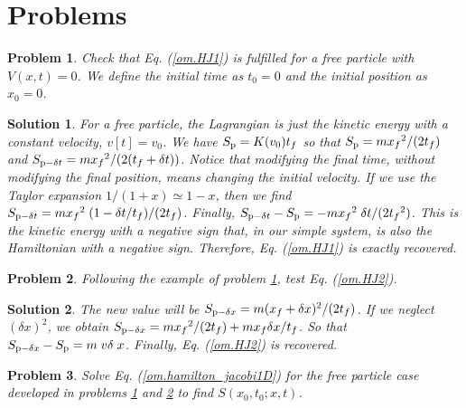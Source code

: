 \documentclass[onecolumn,nofootinbib, secnumarabic, amsmath, nobibnotes,12pt,aps,pra]{revtex4-1}
\newtheorem{problem}{Problem}
\newtheorem{solution}{Solution}
\newcommand{\eref}[1]{Eq. (\ref{#1})}
\begin{document}
\section{Problems}

\begin{problem} \label{om.p1}
Check that \eref{om.HJ1} is fulfilled for a free particle with
$V(x,t) = 0$. We define the initial time as $t_0 = 0$ and the initial
position as $x_0 = 0$.
\end{problem}

\begin{solution}
For a free particle, the Lagrangian is just the kinetic energy with
a constant velocity, $v[t] = v_0$. We have $S_{\rm p} = K(v_0) t_f$
so that $S_{\rm p} = m {x_f}^2/(2 t_f)$ and $S_{{\rm p}-\delta t} =
m {x_f}^2/( 2 (t_f + \delta t))$. Notice that modifying the final
time, without modifying the final position, means changing the
initial velocity. If we use the Taylor expansion  $1/(1 + x)\simeq
1-x$, then we find $S_{{\rm p} - \delta t} = m {x_f}^2 \; (1 -
\delta t/t_f)/(2 t_f)$. Finally, $S_{{\rm p} - \delta t} - S_{\rm p}
= -m {x_f}^2 \; \delta t/(2{t_f}^2)$. This is the kinetic energy
with a negative sign that, in our simple system, is also the
Hamiltonian with a negative sign. Therefore, \eref{om.HJ1} is
exactly recovered.
\end{solution}

\begin{problem} \label{om.p2}
Following the example of problem \ref{om.p1}, test \eref{om.HJ2}.
\end{problem}

\begin{solution}
The new value will be $S_{{\rm p} - \delta x} = m (x_f + \delta
x)^2/(2 t_f)$. If we neglect $(\delta x)^2$, we obtain $S_{{\rm
p} - \delta x} = m {x_f}^2/(2 t_f) + m {x_f} \delta x/t_f$. So that
$S_{{\rm p} - \delta x} - S_{\rm p} = m \; v \delta \; x$. Finally,
\eref{om.HJ2} is recovered.
\end{solution}


\begin{problem} \label{om.p3}
Solve \eref{om.hamilton_jacobi1D} for the free particle case developed in problems \ref{om.p1} and \ref{om.p2} to find $S(x_0,t_0;x,t)$.
\end{problem}
\end{document}
